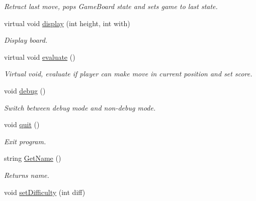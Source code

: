 \begin{DoxyCompactItemize}
\begin{DoxyCompactList}\small\item\em Retract last move, pops Game\-Board state and sets game to last state. \end{DoxyCompactList}\item 
\hypertarget{class_game_ac0c93cb242e1802b94072c3c94e7523a}{virtual void \hyperlink{class_game_ac0c93cb242e1802b94072c3c94e7523a}{display} (int height, int with)}\label{class_game_ac0c93cb242e1802b94072c3c94e7523a}

\begin{DoxyCompactList}\small\item\em Display board. \end{DoxyCompactList}\item 
\hypertarget{class_game_a3bc8822cacd9cf8c5f71021072eb24a4}{virtual void \hyperlink{class_game_a3bc8822cacd9cf8c5f71021072eb24a4}{evaluate} ()}\label{class_game_a3bc8822cacd9cf8c5f71021072eb24a4}

\begin{DoxyCompactList}\small\item\em Virtual void, evaluate if player can make move in current position and set score. \end{DoxyCompactList}\item 
\hypertarget{class_game_a29997a321e10a5456f0aef9e95c51757}{void \hyperlink{class_game_a29997a321e10a5456f0aef9e95c51757}{debug} ()}\label{class_game_a29997a321e10a5456f0aef9e95c51757}

\begin{DoxyCompactList}\small\item\em Switch between debug mode and non-\/debug mode. \end{DoxyCompactList}\item 
\hypertarget{class_game_a8272be134d16c277bb014ad6a22fc357}{void \hyperlink{class_game_a8272be134d16c277bb014ad6a22fc357}{quit} ()}\label{class_game_a8272be134d16c277bb014ad6a22fc357}

\begin{DoxyCompactList}\small\item\em Exit program. \end{DoxyCompactList}\item 
\hypertarget{class_game_ab81299d944d2779d482067640e576389}{string \hyperlink{class_game_ab81299d944d2779d482067640e576389}{Get\-Name} ()}\label{class_game_ab81299d944d2779d482067640e576389}

\begin{DoxyCompactList}\small\item\em Returns name. \end{DoxyCompactList}\item 
\hypertarget{class_game_ae8ac0005c039f0f5f2dd1c10a299fe8d}{void \hyperlink{class_game_ae8ac0005c039f0f5f2dd1c10a299fe8d}{set\-Difficulty} (int diff)}\label{class_game_ae8ac0005c039f0f5f2dd1c10a299fe8d}


\end{DoxyCompactItemize}
